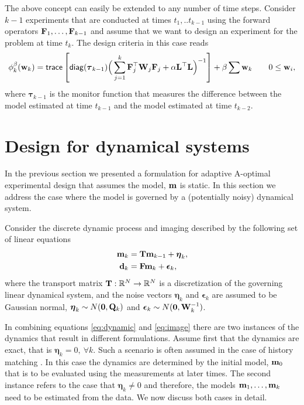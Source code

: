 \documentclass[11pt]{article}
\newcommand{\bfF}	{{\bf{F}}}
\newcommand{\bfL}	{{\bf{L}}}
\newcommand{\bfQ}	{{\bf{Q}}}
\newcommand{\bfT}	{{\bf{T}}}
\newcommand{\bfW}	{{\bf{W}}}
\newcommand{\bfd}	{{\bf{d}}}
\newcommand{\bfm}	{{\bf{m}}}
\newcommand{\bfw}	{{\bf{w}}}
\newcommand{\bfepsilon} {{\boldsymbol \epsilon}}
\newcommand{\bfeta}     {{\boldsymbol \eta}}
\newcommand{\bftau}      {{\boldsymbol \tau}}
\newcommand{\LtL}       { \bfL^{\top}\bfL}
\newcommand {\zero}  { {\bf 0} }
\begin{document}
\bigskip

The above concept can  easily be extended to any number of time steps.
Consider $k-1$ experiments that are conducted at times $t_1,..t_{k-1}$ using
the forward operators $\bfF_{1},\ldots,\bfF_{k-1}$ and assume that we want to design an experiment 
for the problem at time $t_{k}$. The design criteria in this case reads
\begin{align}
\label{amsek}
\phi_{k}^{\beta}(\bfw_{k}) =  {\sf trace} \left[  {\sf diag}(\bftau_{k-1}) \Big(\sum_{j=1}^{k}\bfF_{j}^{\top}\bfW_{j}\bfF_{j}   +
\alpha \LtL\Big)^{-1} \right] + \beta \sum \bfw_{k}\quad \quad 0 \le \bfw_i, 
\end{align}
where $\bftau_{k-1}$ is the monitor function that measures the difference between the model estimated
at time $t_{k-1}$ and the model estimated at time $t_{k-2}$.


\section{Design for dynamical systems}
\label{sec:Dynamic}
In the previous section we presented a formulation for adaptive A-optimal experimental 
design that assumes  the model, $\bfm$
is static. 
In this section we address the case where the model is governed by a (potentially noisy)
dynamical system.

Consider the discrete  dynamic process and imaging  described  by the following set of linear equations
\begin{subequations}
\begin{align}
\label{eq:dynamic}
\bfm _k&= \bfT\bfm_{k-1} + {\bfeta}_k,\\
\label{eq:image}
\bfd_k &= \bfF \bfm_k + {\bfepsilon}_k,
\end{align}  
\end{subequations}
where the transport matrix $\bfT: \mathbb{R}^{N} \rightarrow \mathbb{R}^{N}$  is
 a discretization of the governing linear dynamical  system, and the noise vectors $\bfeta_k $ and $\bfepsilon_k $ are assumed to be Gaussian normal, $\bfeta_k \sim N(\zero,\bfQ_k)$ and ${\bfepsilon_k} \sim N(\zero,\bfW^{-1}_k)$.

In combining equations \eqref{eq:dynamic} and \eqref{eq:image}  there are two instances of the 
dynamics that result in different formulations. 
Assume first that the dynamics are exact, that is $\bfeta_{k}=0, \ \forall  k$.
Such a scenario is often assumed in the case of history matching \cite{Oliver2010a}. In this
case the dynamics are determined by the initial model, $\bfm_{0}$ that is to be evaluated
using the measurements at later times. The second  instance refers to the case that
$\bfeta_{k} \not=0$ and therefore, the models $\bfm_{1},\ldots,\bfm_{k}$ need to be estimated
from the data. We now discuss both cases in detail. 
\end{document}
